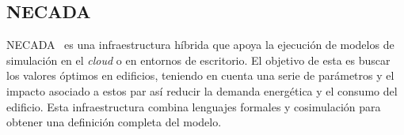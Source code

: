 \subsection{NECADA}
\label{sec:necada}
NECADA~\cite{necada} es una infraestructura híbrida que apoya la ejecución de modelos de simulación en el \textit{cloud} o en entornos de escritorio. El objetivo de esta es buscar los valores óptimos en edificios, teniendo en cuenta una serie de parámetros y el impacto asociado a estos par así reducir la demanda energética y el consumo del edificio. Esta infraestructura combina lenguajes formales y cosimulación para obtener una definición completa del modelo.